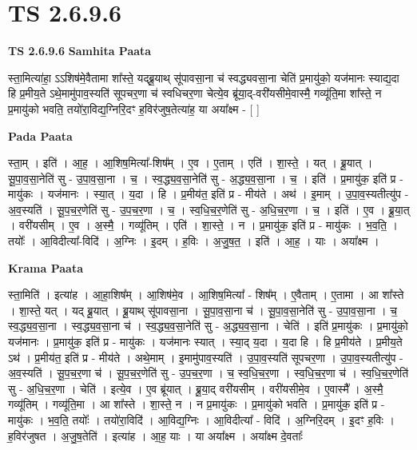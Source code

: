 \documentclass[17pt]{extarticle}
\begin{document}
\section*{ TS 2.6.9.6 }

\textbf{TS 2.6.9.6 } \newline
\textbf{Samhita Paata} \newline

स्ता॒मित्या॑हा॒ ऽऽशिष॑मे॒वैतामा शा᳚स्ते॒ यद्ब्रू॒याथ् सू॑पावसा॒ना च॑ स्वद्ध्यवसा॒ना चेति॑ प्र॒मायु॑को॒ यज॑मानः स्याद्य॒दा हि प्र॒मीय॒ते ऽथे॒मामु॑पाव॒स्यति॑ सूपचर॒णा च॑ स्वधिचर॒णा चेत्ये॒व ब्रू॑या॒द्-वरी॑यसीमे॒वास्मै॒ गव्यू॑ति॒मा शा᳚स्ते॒ न प्र॒मायु॑को भवति॒ तयो॑रा॒विद्य॒ग्निरि॒दꣳ ह॒विर॑जुष॒तेत्या॑ह॒ या अया᳚क्ष्म - [  ] \newline

\textbf{Pada Paata} \newline

स्ता॒म् । इति॑ । आ॒ह॒ । आ॒शिष॒मित्या᳚-शिष᳚म् । ए॒व । ए॒ताम् । एति॑ । शा॒स्ते॒ । यत् । ब्रू॒यात् । सू॒पा॒व॒सा॒नेति॑ सु - उ॒पा॒व॒सा॒ना । च॒ । स्व॒द्ध्य॒व॒सा॒नेति॑ सु - अ॒द्ध्य॒व॒सा॒ना । च॒ । इति॑ । प्र॒मायु॑क॒ इति॑ प्र - मायु॑कः । यज॑मानः । स्या॒त् । य॒दा । हि । प्र॒मीय॑त॒ इति॑ प्र - मीय॑ते । अथ॑ । इ॒माम् । उ॒पा॒व॒स्यतीत्यु॑प - अ॒व॒स्यति॑ । सू॒प॒च॒र॒णेति॑ सु - उ॒प॒च॒र॒णा । च॒ । स्व॒धि॒च॒र॒णेति॑ सु - अ॒धि॒च॒र॒णा । च॒ । इति॑ । ए॒व । ब्रू॒या॒त् । वरी॑यसीम् । ए॒व । अ॒स्मै॒ । गव्यू॑तिम् । एति॑ । शा॒स्ते॒ । न । प्र॒मायु॑क॒ इति॑ प्र - मायु॑कः । भ॒व॒ति॒ । तयोः᳚ । आ॒विदीत्या᳚-विदि॑ । अ॒ग्निः । इ॒दम् । ह॒विः । अ॒जु॒ष॒त॒ । इति॑ । आ॒ह॒ । याः । अया᳚क्ष्म ।  \newline


\textbf{Krama Paata} \newline

स्ता॒मिति॑ । इत्या॑ह । आ॒हा॒शिष᳚म् । आ॒शिष॑मे॒व । आ॒शिष॒मित्या᳚ - शिष᳚म् । ए॒वैताम् । ए॒तामा । आ शा᳚स्ते । शा॒स्ते॒ यत् । यद् ब्रू॒यात् । ब्रू॒याथ् सू॑पावसा॒ना । सू॒पा॒व॒सा॒ना च॑ । सू॒पा॒व॒सा॒नेति॑ सु - उ॒पा॒व॒सा॒ना । च॒ स्व॒द्ध्य॒व॒सा॒ना । स्व॒द्ध्य॒व॒सा॒ना च॑ । स्व॒द्ध्य॒व॒सा॒नेति॑ सु - अ॒द्ध्य॒व॒सा॒ना । चेति॑ । इति॑ प्र॒मायु॑कः । प्र॒मायु॑को॒ यज॑मानः । प्र॒मायु॑क॒ इति॑ प्र - मायु॑कः । यज॑मानः स्यात् । स्या॒द् य॒दा । य॒दा हि । हि प्र॒मीय॑ते । प्र॒मीय॒ते ऽथ॑ । प्र॒मीय॑त॒ इति॑ प्र - मीय॑ते । अथे॒माम् । इ॒मामु॑पाव॒स्यति॑ । उ॒पा॒व॒स्यति॑ सूपचर॒णा । उ॒पा॒व॒स्यतीत्यु॑प - अ॒व॒स्यति॑ । सू॒प॒च॒र॒णा च॑ । सू॒प॒च॒र॒णेति॑ सु - उ॒प॒च॒र॒णा । च॒ स्व॒धि॒च॒र॒णा । स्व॒धि॒च॒र॒णा च॑ । स्व॒धि॒च॒र॒णेति॑ सु - अ॒धि॒च॒र॒णा । चेति॑ । इत्ये॒व । ए॒व ब्रू॑यात् । ब्रू॒या॒द् वरी॑यसीम् । वरी॑यसीमे॒व । ए॒वास्मै᳚ । अ॒स्मै॒ गव्यू॑तिम् । गव्यू॑ति॒मा । आ शा᳚स्ते । शा॒स्ते॒ न । न प्र॒मायु॑कः । प्र॒मायु॑को भवति । प्र॒मायु॑क॒ इति॑ प्र - मायु॑कः । भ॒व॒ति॒ तयोः᳚ । तयो॑रा॒विदि॑ । आ॒विद्य॒ग्निः । आ॒विदीत्या᳚ - विदि॑ । अ॒ग्निरि॒दम् । इ॒दꣳ ह॒विः । ह॒विर॑जुषत । अ॒जु॒ष॒तेति॑ । इत्या॑ह । आ॒ह॒ याः । या अया᳚क्ष्म । अया᳚क्ष्म दे॒वताः᳚ \newline
\end{document}
